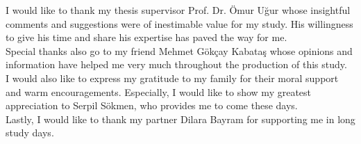 I would like to thank my thesis supervisor Prof. Dr. Ömur U\u{g}ur whose insightful comments and suggestions were of inestimable value for my study. His willingness to give his time and share his expertise has paved the way for me. \\

Special thanks also go to my friend Mehmet Gökçay Kabataş whose opinions and information have helped me very much throughout the production of this study. \\

I would also like to express my gratitude to my family for their moral support and warm encouragements. Especially, I would like to show my greatest appreciation to Serpil Sökmen, who provides me to come these days. \\

Lastly, I would like to thank my partner Dilara Bayram for supporting me in long study days. \\
